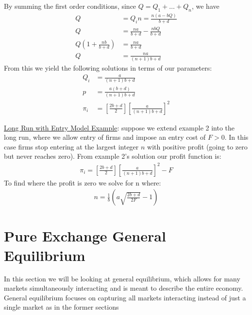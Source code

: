 \documentclass{article}
\begin{document}
  By summing the first order conditions, since $Q = Q_{1} + \dots + Q_{n}$, we have
  \begin{align*}
    Q &= Q_{i}n = \frac{n(a-bQ)}{b+d} \\
    Q &= \frac{na}{b+d} - \frac{nbQ}{b+d} \\
    Q(1+\frac{nb}{b+d}) &= \frac{na}{b+d} \\
    Q &= \frac{na}{(n+1)b + d}
  \end{align*}
  From this we yield the following solutions in terms of our parameters:
  \begin{align*}
    Q_{i} &= \frac{a}{(n+1)b+d} \\
    p &= \frac{a(b+d)}{(n+1)b+d} \\
    \pi_{i} &= [\frac{2b + d}{2}][\frac{a}{(n+1)b+d}]^{2}
  \end{align*}
  \par
  \underline{Long Run with Entry Model Example}: suppose we extend example 2 into the long run, where we allow entry of firms and impose an entry cost of $F > 0$. In this case firms stop entering at the largest integer $n$ with positive profit (going to zero but never reaches zero). From example 2's solution our profit function is:
  \begin{gather*}
    \pi_{i} = [\frac{2b + d}{2}][\frac{a}{(n+1)b+d}]^{2} - F
  \end{gather*}
  To find where the profit is zero we solve for n where:
  \begin{gather*}
    n = \frac{1}{b}(a \sqrt{\frac{2b + d}{2F}} - 1)
  \end{gather*}

\newpage

\section{Pure Exchange General Equilibrium}
In this section we will be looking at general equilibrium, which allows for many markets simultaneously interacting and is meant to describe the entire economy. General equilibrium focuses on capturing all markets interacting instead of just a single market as in the former sections
\vspace{6mm}
\end{document}
